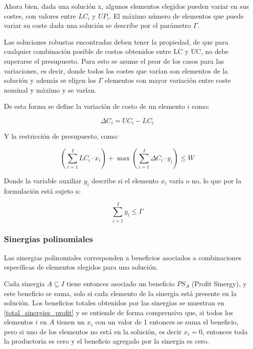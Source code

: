 \documentclass[spanish, a4paper, 12pt, twoside, openany,final]{book}
\numberwithin{equation}{section}                %
\begin{document}
    Ahora bien, dada una solución x, algunos elementos elegidos pueden variar en sus costes, con valores entre $LC_i$ y $UP_i$. El máximo número de elementos que puede variar su coste dada una solución se describe por el parámetro $\Gamma$.
    
    Las soluciones robustas encontradas deben tener la propiedad, de que para cualquier combinación posible de costos obtenidos entre LC y UC, no debe superarse el presupuesto. Para esto se asume el peor de los casos para las variaciones, es decir, donde todos los costes que varían son elementos de la solución y además se eligen los $\Gamma$ elementos con mayor variación entre coste nominal y máximo y se varían.
    
    De esta forma se define la variación de costo de un elemento $i$ como:
    
    $$
    \Delta C_i  = UC_i - LC_i
    $$
    
    Y la restricción de presupuesto, como:
    
    \begin{equation}
   		\label{eq:costs}
    	\left( \sum_{i=1}^I LC_i\cdot x_i\right)  + \max \left( \sum_{i=1}^I \Delta C_i\cdot y_i \right) \leq W
    \end{equation}
    
    Donde la variable auxiliar $y_i$ describe si el elemento $x_i$ varía o no, lo que por la formulación está sujeto a:
    
    $$
    \sum_{i=1}^I y_i \leq \Gamma
    $$
    
    \subsubsection{Sinergias polinomiales}
    Las sinergias polinomiales corresponden a beneficios asociados a combinaciones específicas de elementos elegidos para una solución.
    
    Cada sinergia $A \subseteq I$ tiene entonces asociado un beneficio $PS_A$ (Profit Sinergy), y este beneficio se suma, solo si cada elemento de la sinergia está presente en la solución. Los beneficios totales obtenidos por las sinergias se muestran en \ref{total_sinergies_profit} y se entiende de forma comprensiva que, si todos los elementos $i$ en $A$ tienen un $x_i$ con un valor de 1 entonces se suma el beneficio, pero si uno de los elementos no está en la solución, es decir $x_i = 0$, entonces toda la productoria es cero y el beneficio agregado por la sinergia es cero.
    
\end{document}
